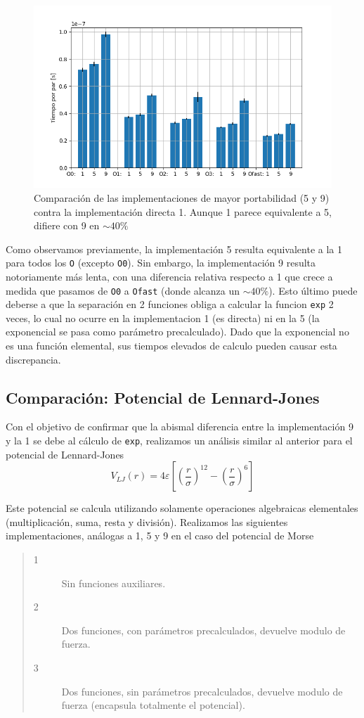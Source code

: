 \documentclass[twoside, 12pt]{article}
\begin{document}
\begin{figure}[h]
	\centering
	\includegraphics[trim = 10mm 5mm 10mm 5mm, clip, width=0.6\columnwidth]{Comp_tiempos_morse.png}
	\caption{Comparaci\'on de las implementaciones de mayor portabilidad (5 y 9) contra la implementaci\'on directa 1. Aunque 1 parece equivalente a 5, difiere con 9 en $\sim 40\%$}
	\label{fig:CompEsp}
\end{figure}

Como observamos previamente, la implementaci\'on 5 resulta equivalente a la 1 para todos los \texttt{O} (excepto \texttt{O0}). Sin embargo, la implementaci\'on 9 resulta notoriamente m\'as lenta, con una diferencia relativa respecto a 1 que crece a medida que pasamos de \texttt{O0} a \texttt{Ofast} (donde alcanza un $\sim40\%$). Esto \'ultimo puede deberse a que la separaci\'on en 2 funciones obliga a calcular la funcion \texttt{exp} 2  veces, lo cual no ocurre en la implementacion 1 (es directa) ni en la 5 (la exponencial se pasa como par\'ametro precalculado). Dado que la exponencial no es una funci\'on elemental, sus tiempos elevados de calculo pueden causar esta discrepancia.

\subsection{Comparación: Potencial de Lennard-Jones}

Con el objetivo de confirmar que la abismal diferencia entre la implementaci\'on 9 y la 1 se debe al c\'alculo de \texttt{exp}, realizamos un an\'alisis similar al anterior para el potencial de Lennard-Jones \[ V_{LJ} (r) =  4\varepsilon \left[ \left(\frac{r}{\sigma}\right)^{12} -\left(\frac{r}{\sigma}\right)^{6} \right] \]

Este potencial se calcula utilizando solamente operaciones algebraicas elementales (multiplicaci\'on, suma, resta y divisi\'on). Realizamos las siguientes implementaciones, an\'alogas a 1, 5 y 9 en el caso del potencial de Morse
	
\begin{quote}
\begin{description}
\item[1] Sin funciones auxiliares.
\item[2] Dos funciones, con parámetros precalculados, devuelve modulo de fuerza.
\item[3] Dos funciones, sin parámetros precalculados, devuelve modulo de fuerza (encapsula totalmente el potencial).
\end{description}
\end{quote}
\end{document}
